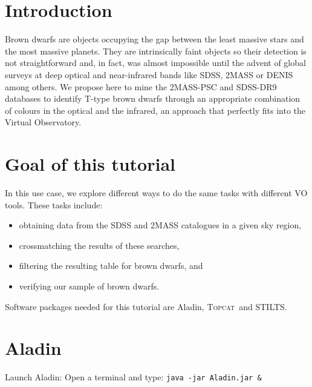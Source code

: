 \documentclass [a4paper, 12pt]{article}
\newcommand{\aladin}{{\textsc{A}{ladin}}}
\newcommand{\topcat}{{\textsc{Topcat}}}
\begin{document}
\newpage

\justify
\section{Introduction}
Brown dwarfs are objects occupying the gap between the least massive
stars and the most massive planets. They are intrinsically faint objects so 
their detection is not straightforward and, in fact, was almost impossible 
until the advent of global surveys at deep optical and near-infrared bands like 
SDSS, 2MASS or DENIS among others. We propose here to mine the 2MASS-PSC and 
SDSS-DR9 databases to identify T-type brown dwarfs through an appropriate
combination of colours in the optical and the infrared, an approach that 
perfectly fits into the Virtual
Observatory.

\section{Goal of this tutorial} 
In this use case, we explore different ways to do the same tasks with different 
VO tools. These tasks include:
\begin{itemize}
\item obtaining data from the SDSS and 2MASS catalogues in a given sky region,
\item crossmatching the results of these searches,
\item filtering the resulting table for brown dwarfs, and 
\item verifying our sample of brown dwarfs.
\end{itemize}
\noindent Software packages needed for this tutorial are \aladin, \topcat\ and 
STILTS.

\section{\aladin}
Launch \aladin: Open a terminal and type: \texttt{java -jar Aladin.jar \&} \\
\end{document}
